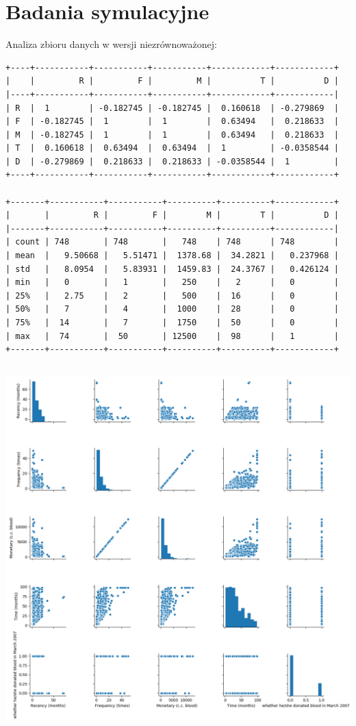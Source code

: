 \documentclass[11pt, a4paper, notitlepage]{report}
\begin{document}
\section{Badania symulacyjne}
Analiza zbioru danych w wersji niezrównoważonej:
\begin{verbatim}
+----+-----------+-----------+-----------+------------+------------+
|    |         R |         F |         M |          T |          D |
|----+-----------+-----------+-----------+------------+------------|
| R  |  1        | -0.182745 | -0.182745 |  0.160618  | -0.279869  |
| F  | -0.182745 |  1        |  1        |  0.63494   |  0.218633  |
| M  | -0.182745 |  1        |  1        |  0.63494   |  0.218633  |
| T  |  0.160618 |  0.63494  |  0.63494  |  1         | -0.0358544 |
| D  | -0.279869 |  0.218633 |  0.218633 | -0.0358544 |  1         |
+----+-----------+-----------+-----------+------------+------------+

+-------+-----------+-----------+----------+----------+------------+
|       |         R |         F |        M |        T |          D |
|-------+-----------+-----------+----------+----------+------------|
| count | 748       | 748       |   748    | 748      | 748        |
| mean  |   9.50668 |   5.51471 |  1378.68 |  34.2821 |   0.237968 |
| std   |   8.0954  |   5.83931 |  1459.83 |  24.3767 |   0.426124 |
| min   |   0       |   1       |   250    |   2      |   0        |
| 25%   |   2.75    |   2       |   500    |  16      |   0        |
| 50%   |   7       |   4       |  1000    |  28      |   0        |
| 75%   |  14       |   7       |  1750    |  50      |   0        |
| max   |  74       |  50       | 12500    |  98      |   1        |
+-------+-----------+-----------+----------+----------+------------+
\end{verbatim}

\includegraphics[width=400pt,height=400pt]{graphics/correlation_1} \\ 
\end{document}
